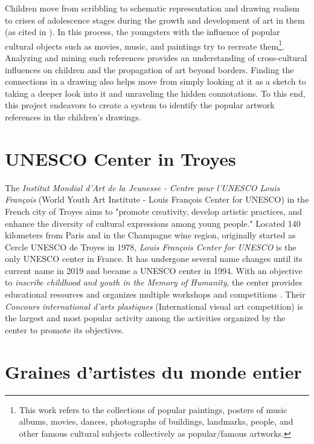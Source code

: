 Children move from scribbling to schematic representation and drawing realism to crises of adolescence stages during the growth and development of art in them \cite{lowenfeld1957creative} (as cited in \cite{kantner_gregory_2002}). In this process, the youngsters with the influence of popular cultural objects such as movies, music, and paintings try to recreate them\footnote{This work refers to the collections of popular paintings, posters of music albums, movies, dances, photographs of buildings, landmarks, people, and other famous cultural subjects collectively as popular/famous artworks.}. Analyzing and mining such references provides an understanding of cross-cultural influences on children and the propagation of art beyond borders. Finding the connections in a drawing also helps move from simply looking at it as a sketch to taking a deeper look into it and unraveling the hidden connotations. To this end, this project endeavors to create a system to identify the popular artwork references in the children's drawings.

\section{UNESCO Center in Troyes}

The \textit{Institut Mondial d'Art de la Jeunesse - Centre pour l'UNESCO Louis François} (World Youth Art Institute - Louis François Center for UNESCO) in the French city of Troyes aims to "promote creativity, develop artistic practices, and enhance the diversity of cultural expressions among young people." Located 140 kilometers from Paris and in the Champagne wine region, originally started as Cercle UNESCO de Troyes in 1978, \textit{Louis François Center for UNESCO} is the only UNESCO center in France. It has undergone several name changes until its current name in 2019 and became a UNESCO center in 1994. With an objective to \textit{inscribe childhood and youth in the Memory of Humanity}, the center provides educational resources and organizes multiple workshops and competitions \cite{centre_unesco_2020}. Their \textit{Concours international d’arts plastiques} (International visual art competition) is the largest and most popular activity among the activities organized by the center to promote its objectives.

\section{\foreignlanguage{french}{Graines d’artistes du monde entier}}

